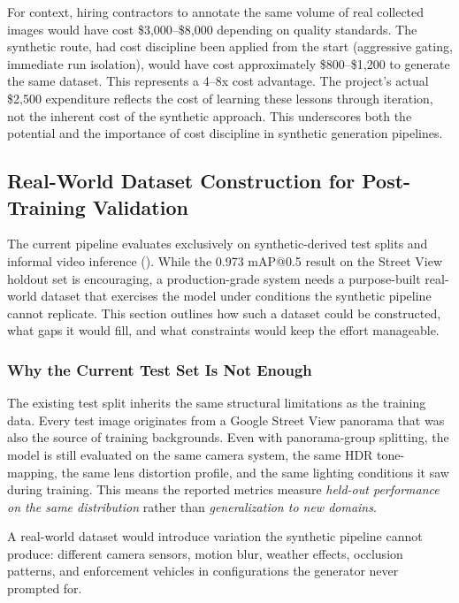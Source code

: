 \documentclass[12pt,a4paper]{article}
\newcommand{\fpath}[1]{\texttt{\detokenize{#1}}}
\begin{document}
For context, hiring contractors to annotate the same volume of real collected images would have cost \$3,000--\$8,000 depending on quality standards. The synthetic route, had cost discipline been applied from the start (aggressive gating, immediate run isolation), would have cost approximately \$800--\$1,200 to generate the same dataset. This represents a 4--8x cost advantage. The project's actual \$2,500 expenditure reflects the cost of learning these lessons through iteration, not the inherent cost of the synthetic approach. This underscores both the potential and the importance of cost discipline in synthetic generation pipelines.

\subsection{Real-World Dataset Construction for Post-Training Validation}

The current pipeline evaluates exclusively on synthetic-derived test splits and informal video inference (\fpath{test-videos/}). While the 0.973 mAP@0.5 result on the Street View holdout set is encouraging, a production-grade system needs a purpose-built real-world dataset that exercises the model under conditions the synthetic pipeline cannot replicate. This section outlines how such a dataset could be constructed, what gaps it would fill, and what constraints would keep the effort manageable.

\subsubsection{Why the Current Test Set Is Not Enough}

The existing test split inherits the same structural limitations as the training data. Every test image originates from a Google Street View panorama that was also the source of training backgrounds. Even with panorama-group splitting, the model is still evaluated on the same camera system, the same HDR tone-mapping, the same lens distortion profile, and the same lighting conditions it saw during training. This means the reported metrics measure \emph{held-out performance on the same distribution} rather than \emph{generalization to new domains}.

A real-world dataset would introduce variation the synthetic pipeline cannot produce: different camera sensors, motion blur, weather effects, occlusion patterns, and enforcement vehicles in configurations the generator never prompted for.
\end{document}
